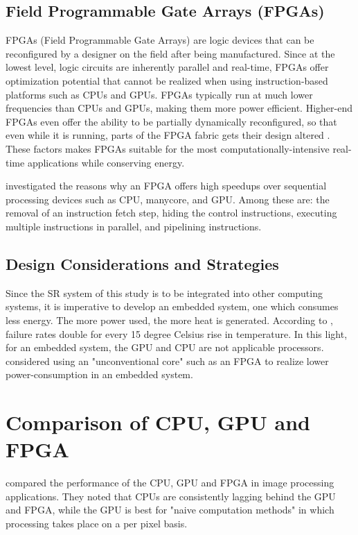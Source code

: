 \subsection{Field Programmable Gate Arrays (FPGAs)}
FPGAs (Field Programmable Gate Arrays) are logic devices that can be reconfigured by a designer on the field after being manufactured.
Since at the lowest level, logic circuits are inherently parallel and real-time, FPGAs offer optimization potential that cannot be realized when using instruction-based platforms such as CPUs and GPUs. FPGAs typically run at much lower frequencies than CPUs and GPUs, making them more power efficient.
Higher-end FPGAs even offer the ability to be partially dynamically reconfigured, so that even while it is running, parts of the FPGA fabric gets their design altered \citep{Dye2012}.
These factors makes FPGAs suitable for the most computationally-intensive real-time applications while conserving energy.
	
\cite{Sirowy2008} investigated the reasons why an FPGA offers high speedups over sequential processing devices such as CPU, manycore, and GPU. 
Among these are: the removal of an instruction fetch step, hiding the control instructions, executing multiple instructions in parallel, and pipelining instructions.


\subsection{Design Considerations and Strategies}
Since the SR system of this study is to be integrated into other computing systems, it is imperative to develop an embedded system, one which consumes less energy.
The more power used, the more heat is generated. According to \cite{Anderson2003}, failure rates double for every 15 degree Celsius rise in temperature.
In this light, for an embedded system, the GPU and CPU are not applicable processors.
\cite{Mittal2014} considered using an "unconventional core" such as an FPGA to realize lower power-consumption in an embedded system.
\cite{Struyf2014}

\section{Comparison of CPU, GPU and FPGA}

\cite{Asano2009} compared the performance of the CPU, GPU and FPGA in image processing applications. 
They noted that CPUs are consistently lagging behind the GPU and FPGA, while the GPU is best for "naive computation methods" in which processing takes place on a per pixel basis.

